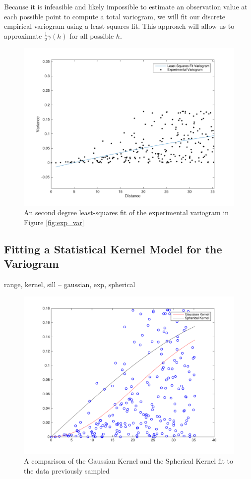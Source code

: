 \documentclass[11pt]{ucthesis}
\begin{document}
Because it is infeasible and likely impossible to estimate an observation value at each possible point to compute a total variogram, we will fit our discrete empirical variogram using a least squares fit. This approach will allow us to approximate $\frac{1}{2}\gamma(h)$ for all possible $h$.
\begin{figure}[H]
    \centering    
	\includegraphics[width=\linewidth]{figures/fit_exp_variogram.png}
	\captionsetup{skip=0.5\baselineskip,size=footnotesize}
	\caption{An second degree least-squares fit of the experimental variogram in Figure \ref{fig:exp_var}}
	\label{fig:fit_exp_var}
\end{figure}

\subsection{Fitting a Statistical Kernel Model for the Variogram}
range, kernel, sill -- gaussian, exp, spherical
\begin{figure}[H]
    \centering    
	\includegraphics[width=\linewidth]{figures/fit_kern_comp.png}
	\captionsetup{skip=0.5\baselineskip,size=footnotesize}
	\caption{A comparison of the Gaussian Kernel and the Spherical Kernel fit to the data previously sampled}
	\label{fig:kern_fit}
\end{figure}
\end{document}
